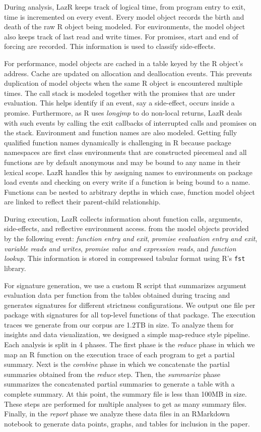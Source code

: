 \documentclass[review,nonacm,screen,acmsmall,anonymous=true]{acmart}
\renewcommand{\c}[1]{\lstinline |#1|\xspace}
\newcommand{\lazr}{{\sf LazR}\xspace}
\begin{document}
During analysis, \lazr keeps track of logical time, from program entry to exit,
time is incremented on every event. Every model object records the birth and
death of the raw R object being modeled. For environments, the model object also
keeps track of last read and write times. For promises, start and end of forcing
are recorded. This information is used to classify side-effects.

For performance, model objects are cached in a table keyed by the R object's
address. Cache are updated on allocation and deallocation events. This prevents
duplication of model objects when the same R object is encountered multiple
times. The call stack is modeled together with the promises that are under
evaluation. This helps identify if an event, say a side-effect, occurs inside a
promise. Furthermore, as R uses \emph{longjmp} to do non-local returns, \lazr
deals with such events by calling the exit callbacks of interrupted calls and
promises on the stack. Environment and function names are also modeled. Getting
fully qualified function names dynamically is challenging in R because package
namespaces are first class environments that are constructed piecemeal and all
functions are by default anonymous and may be bound to any name in their lexical
scope. \lazr handles this by assigning names to environments on package load
events and checking on every write if a function is being bound to a name.
Functions can be nested to arbitrary depths in which case, function model object
are linked to reflect their parent-child relationship.

During execution, \lazr collects information about function calls, arguments,
side-effects, and reflective environment access. from the model objects provided
by the following event: \emph{function entry and exit}, \emph{promise evaluation
entry and exit}, \emph{variable reads and writes}, \emph{promise value and
expression reads}, and \emph{function lookup}. This information is stored in
compressed tabular format using R's \c{fst} library.

For signature generation, we use a custom R script that summarizes argument
evaluation data per function from the tables obtained during tracing and
generates signatures for different strictness configurations. We output one file
per package with signatures for all top-level functions of that package.
The execution traces we generate from our corpus are 1.2TB in size. To analyze
them for insights and data visualization, we designed a simple map-reduce style
pipeline. Each analysis is split in 4 phases. The first phase is the
\emph{reduce} phase in which we map an R function on the execution trace of each
program to get a partial summary. Next is the \emph{combine} phase in which we
concatenate the partial summaries obtained from the \emph{reduce} step. Then,
the \emph{summarize} phase summarizes the concatenated partial summaries to
generate a table with a complete summary. At this point, the summary file is
less than 100MB in size. These steps are performed for multiple analyses to get
as many summary files. Finally, in the \emph{report} phase we analyze these data
files in an RMarkdown notebook to generate data points, graphs, and tables for
inclusion in the paper.
\end{document}
